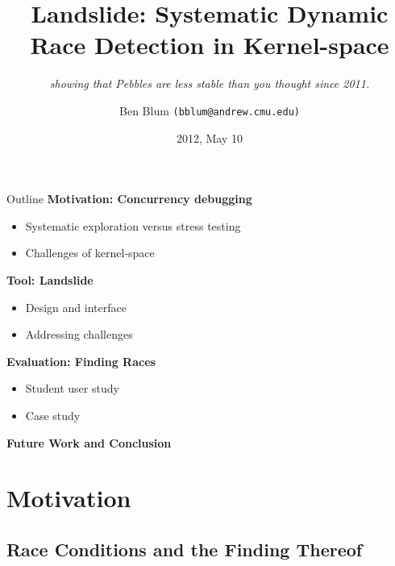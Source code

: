\documentclass[xcolor=dvipsnames]{beamer}
\title[Landslide]{{\bf Landslide: Systematic Dynamic Race Detection in Kernel-space}}
\subtitle[]{ {\em showing that Pebbles are less stable than you thought since 2011.}}
\author[Ben Blum]{Ben Blum \texttt{(bblum@andrew.cmu.edu)}}
\institute[CMU]{Carnegie Mellon University}
\date[]{2012, May 10}
\begin{document}
\normalem
\begin{frame}
	\titlepage
\end{frame}


\newcommand\linegap{\vspace{0.2in}}
\newcommand\breakslide[1]{\begin{frame}{} \begin{center} #1 \end{center} \end{frame}}
\newcommand\related[1]{\textsuperscript{\em #1}}

\begin{frame}{Outline}
	\textbf{Motivation: Concurrency debugging}
	\begin{itemize}
		\item Systematic exploration versus stress testing
		\item Challenges of kernel-space
	\end{itemize}
	\linegap

	{\bf Tool: Landslide}
	\begin{itemize}
		\item Design and interface 
		\item Addressing challenges
	\end{itemize}
	\linegap

	{\bf Evaluation: Finding Races}
	\begin{itemize}
		\item Student user study
		\item Case study
	\end{itemize}
	\linegap

	{\bf Future Work and Conclusion}
\end{frame}

\section{Motivation}

\subsection{Race Conditions and the Finding Thereof}
\end{document}
